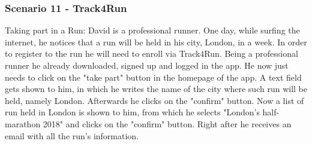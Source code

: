{\color{secblue}\subsubsection{Scenario 11 - Track4Run}}
Taking part in a Run:
David is a professional runner.
One day, while surfing the internet, he notices that a run will be held in his city, London, in a week.
In order to register to the run he will need to enroll via Track4Run. Being a professional runner he already downloaded, signed up and logged in the app.
He now just needs to click on the "take part" button in the homepage of the app. 
A text field gets shown to him, in which he writes the name of the city where such run will be held, namely London. 
Afterwards he clicks on the "confirm" button. 
Now a list of run held in London is shown to him, from which he selects "London's half-marathon 2018" and clicks on the "confirm" button.
Right after he receives an email with all the run's information.

